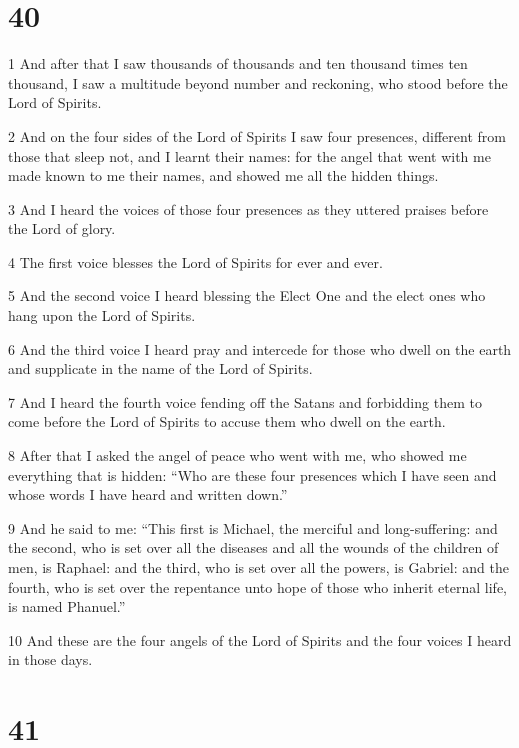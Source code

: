 \chapter{40}

\par 1 And after that I saw thousands of thousands and ten thousand times ten thousand, I saw a multitude beyond number and reckoning, who stood before the Lord of Spirits.
\par 2 And on the four sides of the Lord of Spirits I saw four presences, different from those that sleep not, and I learnt their names: for the angel that went with me made known to me their names, and showed me all the hidden things.
\par 3 And I heard the voices of those four presences as they uttered praises before the Lord of glory.
\par 4 The first voice blesses the Lord of Spirits for ever and ever.
\par 5 And the second voice I heard blessing the Elect One and the elect ones who hang upon the Lord of Spirits.
\par 6 And the third voice I heard pray and intercede for those who dwell on the earth and supplicate in the name of the Lord of Spirits.
\par 7 And I heard the fourth voice fending off the Satans and forbidding them to come before the Lord of Spirits to accuse them who dwell on the earth.
\par 8 After that I asked the angel of peace who went with me, who showed me everything that is hidden: “Who are these four presences which I have seen and whose words I have heard and written down.”
\par 9 And he said to me: “This first is Michael, the merciful and long-suffering: and the second, who is set over all the diseases and all the wounds of the children of men, is Raphael: and the third, who is set over all the powers, is Gabriel: and the fourth, who is set over the repentance unto hope of those who inherit eternal life, is named Phanuel.”
\par 10 And these are the four angels of the Lord of Spirits and the four voices I heard in those days.

\chapter{41}

